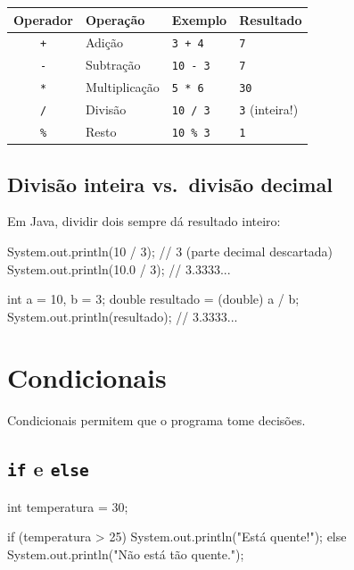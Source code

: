 \documentclass[11pt,a4paper]{article}
\begin{document}
\begin{center}
\begin{tabular}{c l l l}
\toprule
\textbf{Operador} & \textbf{Operação} & \textbf{Exemplo} & \textbf{Resultado} \\
\midrule
\texttt{+} & Adição         & \texttt{3 + 4}  & \texttt{7}           \\
\texttt{-} & Subtração      & \texttt{10 - 3} & \texttt{7}           \\
\texttt{*} & Multiplicação  & \texttt{5 * 6}  & \texttt{30}          \\
\texttt{/} & Divisão        & \texttt{10 / 3} & \texttt{3} (inteira!) \\
\texttt{\%} & Resto         & \texttt{10 \% 3} & \texttt{1}          \\
\bottomrule
\end{tabular}
\end{center}

\subsection{Divisão inteira vs.\ divisão decimal}

Em Java, dividir dois  sempre dá resultado inteiro:

\begin{javacode}
System.out.println(10 / 3);    // 3  (parte decimal descartada)
System.out.println(10.0 / 3);  // 3.3333...

int a = 10, b = 3;
double resultado = (double) a / b;
System.out.println(resultado); // 3.3333...
\end{javacode}

\section{Condicionais}

Condicionais permitem que o programa tome decisões.

\subsection{\texttt{if} e \texttt{else}}

\begin{javacode}
int temperatura = 30;

if (temperatura > 25) {
    System.out.println("Está quente!");
} else {
    System.out.println("Não está tão quente.");
}
\end{javacode}
\end{document}

